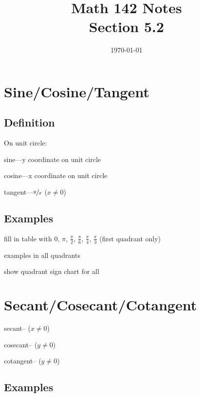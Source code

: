\documentclass{exam}
\title{Math 142 Notes \\ Section 5.2}
\date{\today}
\begin{document}
  \maketitle
  \tableofcontents

  \section{Sine/Cosine/Tangent}

  \subsection{Definition}

  On unit circle:
  \begin{itemize*}
    \item sine---y coordinate on unit circle
    \item cosine---x coordinate on unit circle
    \item tangent---$\sfrac{y}{x}$ ($x \neq 0$)
  \end{itemize*}

  \subsection{Examples}

  \begin{itemize*}
    \item fill in table with 0, $\pi$, $\frac{\pi}{2}$, $\frac{\pi}{6}$, $\frac{\pi}{4}$, $\frac{\pi}{3}$ (first
      quadrant only)
    \item examples in all quadrants
    \item show quadrant sign chart for all
  \end{itemize*}

  \section{Secant/Cosecant/Cotangent}
  \begin{itemize*}
    \item secant-- ($x \neq 0$)
    \item cosecant-- ($y \neq 0$)
    \item cotangent-- ($y \neq 0$)
  \end{itemize*}

  \subsection{Examples}
\end{document}
